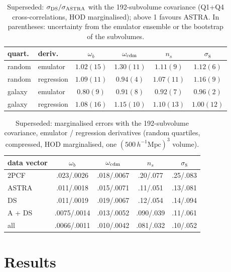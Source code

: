 \documentclass[11pt,twocolumn]{article}
\newcommand{\Mpch}{\,h^{-1}\mathrm{Mpc}}
\begin{document}
\begin{table}[!htbp]
\centering\small
\begin{tabular}{llcccc}
\toprule
quart. & deriv. & $\omega_b$ & $\omega_{\rm cdm}$ & $n_s$ & $\sigma_8$ \\
\midrule
random & emulator & $1.02(15)$ & $1.30(11)$ & $1.11(9)$ & $1.12(6)$ \\
random & regression & $1.09(11)$ & $0.94(4)$ & $1.07(11)$ & $1.16(9)$ \\
galaxy & emulator & $0.80(9)$ & $0.91(8)$ & $0.92(7)$ & $0.96(2)$ \\
galaxy & regression & $1.08(16)$ & $1.15(10)$ & $1.10(13)$ & $1.00(12)$ \\
\bottomrule
\end{tabular}
\caption{Superseded: $\sigma_{\rm DS}/\sigma_{\rm ASTRA}$ with the 192-subvolume covariance (Q1+Q4 cross-correlations, HOD marginalised); above 1 favours ASTRA. In parentheses: uncertainty from the emulator ensemble or the bootstrap of the subvolumes.}
\label{tab:ratio}
\end{table}

\begin{table}[!htbp]
\centering\small
\begin{tabular}{lcccc}
\toprule
data vector & $\omega_b$ & $\omega_{\rm cdm}$ & $n_s$ & $\sigma_8$ \\
\midrule
2PCF & .023/.0026 & .018/.0067 & .20/.077 & .25/.083 \\
ASTRA & .011/.0018 & .015/.0071 & .11/.051 & .13/.081 \\
DS & .011/.0019 & .019/.0067 & .12/.054 & .14/.094 \\
A + DS & .0075/.0014 & .013/.0052 & .090/.039 & .11/.061 \\
all & .0066/.0011 & .010/.0042 & .081/.032 & .10/.052 \\
\bottomrule
\end{tabular}
\caption{Superseded: marginalised errors with the 192-subvolume covariance, emulator / regression derivatives (random quartiles, compressed, HOD marginalised, one $(500\Mpch)^3$ volume).}
\label{tab:sigma_sub}
\end{table}

\section{Results}
\label{sec:results}
\end{document}
